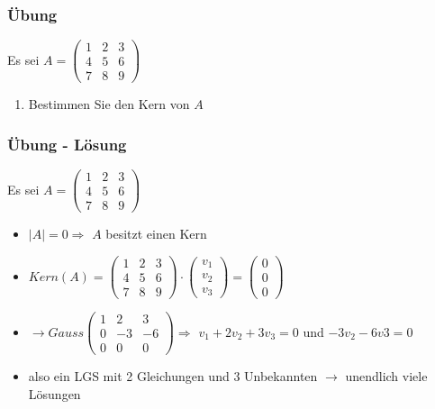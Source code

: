 \begin{frame}
    \frametitle{Übung}
    Es sei
    $A =
    \begin{pmatrix}
        1 & 2 & 3 \\
        4 & 5 & 6 \\
        7 & 8 & 9
    \end{pmatrix}$
    \begin{enumerate}
        \item Bestimmen Sie den Kern von $A$
    \end{enumerate}
\end{frame}

\begin{frame}
    \frametitle{Übung - Lösung}
    Es sei
    $A =
    \begin{pmatrix}
        1 & 2 & 3 \\
        4 & 5 & 6 \\
        7 & 8 & 9
    \end{pmatrix}$
    \begin{itemize}
        \item $|A| = 0 \Rightarrow$ $A$ besitzt einen Kern
        \item $Kern(A) =
        \begin{pmatrix}
            1 & 2 & 3 \\
            4 & 5 & 6 \\
            7 & 8 & 9
        \end{pmatrix}
        \cdot
        \begin{pmatrix}
            v_1 \\
            v_2 \\
            v_3
        \end{pmatrix}
        =
        \begin{pmatrix}
            0 \\
            0 \\
            0
        \end{pmatrix}$
        \item $\rightarrow{Gauss} \begin{pmatrix}
            1 & 2 & 3 \\
            0 & -3 & -6 \\
            0 & 0 & 0
        \end{pmatrix} \Rightarrow$ $v_1 + 2v_2 + 3v_3 = 0$ und $-3v_2 -6v3 = 0$
		\item also ein LGS mit 2 Gleichungen und 3 Unbekannten $\rightarrow$ unendlich viele Lösungen
    \end{itemize}
\end{frame}

